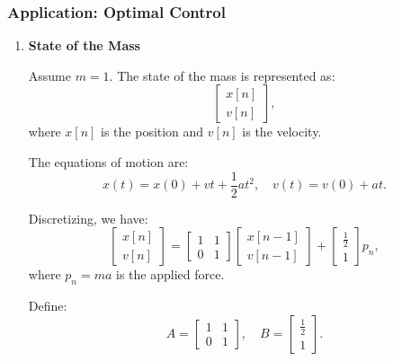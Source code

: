 \subsubsection{Application: Optimal Control}
\begin{example}
    \begin{enumerate}
        \item \textbf{State of the Mass}

        Assume \( m = 1 \). The state of the mass is represented as:
        \[
        \begin{bmatrix}
        x[n] \\ 
        v[n]
        \end{bmatrix},
        \]
        where \(x[n]\) is the position and \(v[n]\) is the velocity.

        
        The equations of motion are:
        \[
        x(t) = x(0) + vt + \frac{1}{2} a t^2, \quad v(t) = v(0) + at.
        \]
        
        Discretizing, we have:
        \[
        \begin{bmatrix}
        x[n] \\ 
        v[n]
        \end{bmatrix}
        =
        \begin{bmatrix}
        1 & 1 \\ 
        0 & 1
        \end{bmatrix}
        \begin{bmatrix}
        x[n-1] \\ 
        v[n-1]
        \end{bmatrix}
        +
        \begin{bmatrix}
        \frac{1}{2} \\ 
        1
        \end{bmatrix} p_n,
        \]
        where \(p_n = ma\) is the applied force.
        
        Define:
        \[
        A = 
        \begin{bmatrix}
        1 & 1 \\ 
        0 & 1
        \end{bmatrix}, \quad 
        B = 
        \begin{bmatrix}
        \frac{1}{2} \\ 
        1
        \end{bmatrix}.
        \]
        

\end{enumerate}
\end{example}
